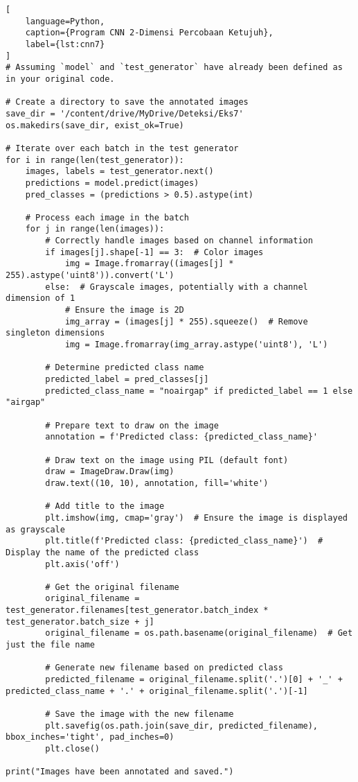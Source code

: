 \begin{lstlisting}[
    language=Python,
    caption={Program CNN 2-Dimensi Percobaan Ketujuh},
    label={lst:cnn7}
]
# Assuming `model` and `test_generator` have already been defined as in your original code.

# Create a directory to save the annotated images
save_dir = '/content/drive/MyDrive/Deteksi/Eks7'
os.makedirs(save_dir, exist_ok=True)

# Iterate over each batch in the test generator
for i in range(len(test_generator)):
    images, labels = test_generator.next()
    predictions = model.predict(images)
    pred_classes = (predictions > 0.5).astype(int)

    # Process each image in the batch
    for j in range(len(images)):
        # Correctly handle images based on channel information
        if images[j].shape[-1] == 3:  # Color images
            img = Image.fromarray((images[j] * 255).astype('uint8')).convert('L')
        else:  # Grayscale images, potentially with a channel dimension of 1
            # Ensure the image is 2D
            img_array = (images[j] * 255).squeeze()  # Remove singleton dimensions
            img = Image.fromarray(img_array.astype('uint8'), 'L')

        # Determine predicted class name
        predicted_label = pred_classes[j]
        predicted_class_name = "noairgap" if predicted_label == 1 else "airgap"

        # Prepare text to draw on the image
        annotation = f'Predicted class: {predicted_class_name}'

        # Draw text on the image using PIL (default font)
        draw = ImageDraw.Draw(img)
        draw.text((10, 10), annotation, fill='white')

        # Add title to the image
        plt.imshow(img, cmap='gray')  # Ensure the image is displayed as grayscale
        plt.title(f'Predicted class: {predicted_class_name}')  # Display the name of the predicted class
        plt.axis('off')

        # Get the original filename
        original_filename = test_generator.filenames[test_generator.batch_index * test_generator.batch_size + j]
        original_filename = os.path.basename(original_filename)  # Get just the file name

        # Generate new filename based on predicted class
        predicted_filename = original_filename.split('.')[0] + '_' + predicted_class_name + '.' + original_filename.split('.')[-1]

        # Save the image with the new filename
        plt.savefig(os.path.join(save_dir, predicted_filename), bbox_inches='tight', pad_inches=0)
        plt.close()

print("Images have been annotated and saved.")
\end{lstlisting}

